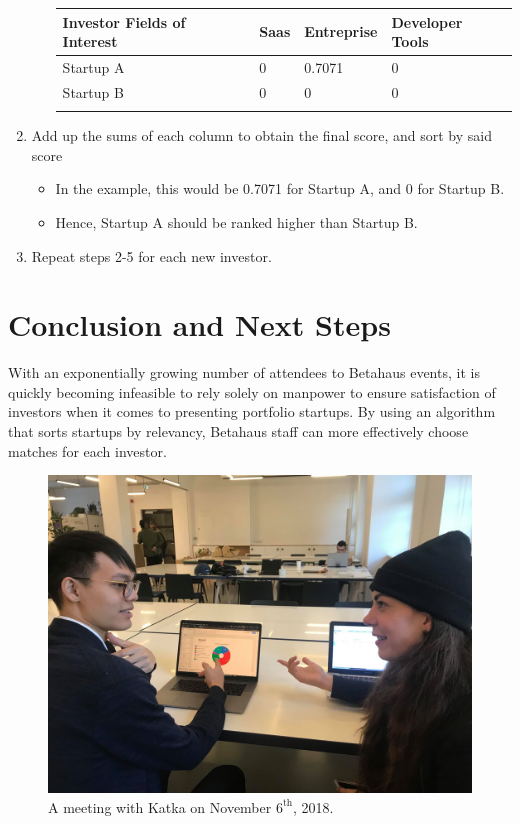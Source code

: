 \documentclass{article}
\begin{document}
\begin{enumerate}
\begin{itemize}
\begin{tabular}{llll}
\hline
\multicolumn{1}{|l|}{Investor Fields of Interest} & \multicolumn{1}{l|}{Saas} & \multicolumn{1}{l|}{Entreprise} & \multicolumn{1}{l|}{Developer Tools} \\ \hline
\multicolumn{1}{|l|}{Startup A}                   & \multicolumn{1}{l|}{0}    & \multicolumn{1}{l|}{0.7071}     & \multicolumn{1}{l|}{0}               \\ \hline
\multicolumn{1}{|l|}{Startup B}                   & \multicolumn{1}{l|}{0}    & \multicolumn{1}{l|}{0}          & \multicolumn{1}{l|}{0}               \\ \hline
                                                  &                           &                                 &                                     
\end{tabular}
 \end{itemize}
\item Add up the sums of each column to obtain the final score, and sort by said score \begin{itemize}
\itemsep-0.3em \item In the example, this would be 0.7071 for Startup A, and 0 for Startup B.
\item Hence, Startup A should be ranked higher than Startup B. 
\end{itemize}


\item Repeat steps 2-5 for each new investor.
\end{enumerate}


\section*{Conclusion and Next Steps}
With an exponentially growing number of attendees to Betahaus events, it is quickly becoming infeasible to rely solely on manpower to ensure satisfaction of investors when it comes to presenting portfolio startups. By using an algorithm that sorts startups by relevancy, Betahaus staff can more effectively choose matches for each investor.

	
\begin{figure}[h]
\center
\includegraphics[scale = 0.2]{katka.jpg}
\caption{A meeting with Katka on November $6^{\textrm{th}}$, 2018.}
\end{figure}





	
\end{document}

